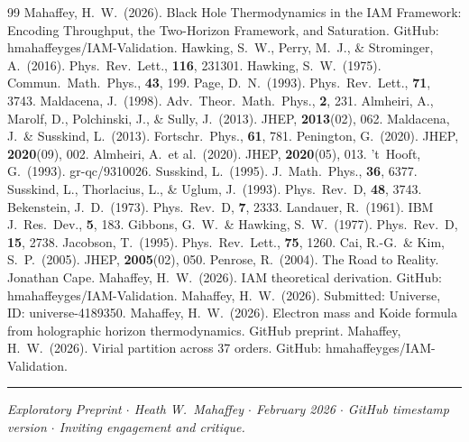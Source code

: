 \documentclass[12pt,letterpaper]{article}
\begin{document}
\vspace{12pt}
\begin{thebibliography}{99}
 Mahaffey, H.\ W.\ (2026). Black Hole Thermodynamics in the IAM Framework: Encoding Throughput, the Two-Horizon Framework, and Saturation. GitHub: hmahaffeyges/IAM-Validation.
 Hawking, S.\ W., Perry, M.\ J., \& Strominger, A.\ (2016). Phys.\ Rev.\ Lett., \textbf{116}, 231301.
 Hawking, S.\ W.\ (1975). Commun.\ Math.\ Phys., \textbf{43}, 199.
 Page, D.\ N.\ (1993). Phys.\ Rev.\ Lett., \textbf{71}, 3743.
 Maldacena, J.\ (1998). Adv.\ Theor.\ Math.\ Phys., \textbf{2}, 231.
 Almheiri, A., Marolf, D., Polchinski, J., \& Sully, J.\ (2013). JHEP, \textbf{2013}(02), 062.
 Maldacena, J.\ \& Susskind, L.\ (2013). Fortschr.\ Phys., \textbf{61}, 781.
 Penington, G.\ (2020). JHEP, \textbf{2020}(09), 002.
 Almheiri, A.\ et al.\ (2020). JHEP, \textbf{2020}(05), 013.
 't~Hooft, G.\ (1993). gr-qc/9310026.
 Susskind, L.\ (1995). J.\ Math.\ Phys., \textbf{36}, 6377.
 Susskind, L., Thorlacius, L., \& Uglum, J.\ (1993). Phys.\ Rev.\ D, \textbf{48}, 3743.
 Bekenstein, J.\ D.\ (1973). Phys.\ Rev.\ D, \textbf{7}, 2333.
 Landauer, R.\ (1961). IBM J.\ Res.\ Dev., \textbf{5}, 183.
 Gibbons, G.\ W.\ \& Hawking, S.\ W.\ (1977). Phys.\ Rev.\ D, \textbf{15}, 2738.
 Jacobson, T.\ (1995). Phys.\ Rev.\ Lett., \textbf{75}, 1260.
 Cai, R.-G.\ \& Kim, S.\ P.\ (2005). JHEP, \textbf{2005}(02), 050.
 Penrose, R.\ (2004). The Road to Reality. Jonathan Cape.
 Mahaffey, H.\ W.\ (2026). IAM theoretical derivation. GitHub: hmahaffeyges/IAM-Validation.
 Mahaffey, H.\ W.\ (2026). Submitted: Universe, ID: universe-4189350.
 Mahaffey, H.\ W.\ (2026). Electron mass and Koide formula from holographic horizon thermodynamics. GitHub preprint.
 Mahaffey, H.\ W.\ (2026). Virial partition across 37 orders. GitHub: hmahaffeyges/IAM-Validation.
\end{thebibliography}

\vspace{8pt}\rule{\linewidth}{0.4pt}
{\small\textit{Exploratory Preprint $\cdot$ Heath W.\ Mahaffey $\cdot$ February 2026 $\cdot$
GitHub timestamp version $\cdot$ Inviting engagement and critique.}}
\end{document}

